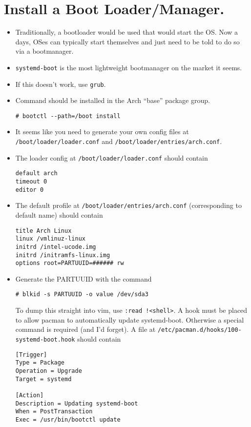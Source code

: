 \documentclass{article}
\begin{document}
\section{Install a Boot Loader/Manager.}

\begin{itemize}
  \item Traditionally, a bootloader would be used that would start the OS.
    Now a days, OSes can typically start themselves and just need to be told to do so via a bootmanager.
  \item \verb|systemd-boot| is the most lightweight bootmanager on the market it seems.
  \item If this doesn't work, use \verb|grub|.
  \item Command should be installed in the Arch ``base'' package group.
\begin{verbatim}
# bootctl --path=/boot install
\end{verbatim}
  \item It seems like you need to generate your own config files at \verb|/boot/loader/loader.conf| and \verb|/boot/loader/entries/arch.conf|.
  \item The loader config at \verb|/boot/loader/loader.conf| should contain
\begin{verbatim}
default arch
timeout 0
editor 0
\end{verbatim}
  \item The default profile at \verb|/boot/loader/entries/arch.conf| (corresponding to default name) should contain
\begin{verbatim}
title Arch Linux
linux /vmlinuz-linux
initrd /intel-ucode.img
initrd /initramfs-linux.img
options root=PARTUUID=###### rw
\end{verbatim}
  \item Generate the PARTUUID with the command
\begin{verbatim}
# blkid -s PARTUUID -o value /dev/sda3
\end{verbatim}
    To dump this straight into vim, use \verb|:read !<shell>|.
    A hook must be placed to allow pacman to automatically update systemd-boot.
    Otherwise a special command is required (and I'd forget).
    A file at \verb|/etc/pacman.d/hooks/100-systemd-boot.hook| should contain
\begin{verbatim}
[Trigger]
Type = Package
Operation = Upgrade
Target = systemd

[Action]
Description = Updating systemd-boot
When = PostTransaction
Exec = /usr/bin/bootctl update
\end{verbatim}
\end{itemize}
\end{document}
